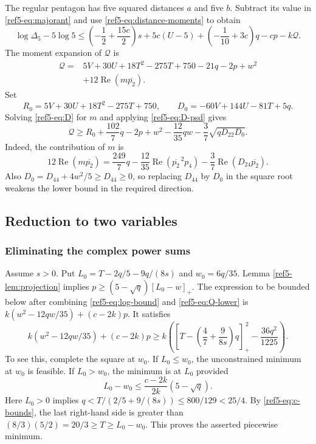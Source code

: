 \documentclass[11pt]{article}
\theoremstyle{remark}
\newcommand{\pos}[1]{[#1]_+}
\newcommand{\Rea}{\operatorname{Re}}
\numberwithin{equation}{section}
\begin{document}
The regular pentagon has five squared distances $a$ and five $b$.
Subtract its value in \eqref{ref5-eq:majorant} and use
\eqref{ref5-eq:distance-moments} to obtain
\begin{equation}\label{ref5-eq:log-bound}
 \log\Delta_5-5\log5\le
 \left(-\frac12+\frac{15c}{2}\right)s+5c(U-5)
 +\left(-\frac1{10}+3c\right)q-cp-k\mathcal Q.
\end{equation}
The moment expansion of $\mathcal Q$ is
\begin{equation}\label{ref5-eq:Q-expand}
\begin{aligned}
 \mathcal Q={}&5V+30U+18T^2-275T+750-21q-2p+w^2\\
             &+12\Rea(m\overline{p_2}).
\end{aligned}
\end{equation}
Set
\[
 R_0=5V+30U+18T^2-275T+750,\qquad
 D_0=-60V+144U-81T+5q.
\]
Solving \eqref{ref5-eq:D} for $m$ and applying \eqref{ref5-eq:D-psd} gives
\begin{equation}\label{ref5-eq:Q-lower}
 \mathcal Q\ge R_0+\frac{102}{7}q-2p+w^2-\frac{12}{35}qw
       -\frac37\sqrt{qD_{22}D_0}.
\end{equation}
Indeed, the contribution of $m$ is
\[
12\Rea(m\overline{p_2})
 =\frac{249}{7}q-\frac{12}{35}\Rea(\overline{p_2}^{\,2}p_4)
 -\frac37\Rea(D_{24}\overline{p_2}).
\]
Also $D_0=D_{44}+4w^2/5\ge D_{44}\ge0$, so replacing $D_{44}$
by $D_0$ in the square root weakens the lower bound in the required
direction.

\subsection{Reduction to two variables}
\subsubsection{Eliminating the complex power sums}
Assume $s>0$. Put $L_0=T-2q/5-9q/(8s)$ and $w_0=6q/35$.
Lemma \ref{ref5-lem:projection} implies
$p\ge(5-\sqrt q)\pos{L_0-w}$.
The expression to be bounded below after combining
\eqref{ref5-eq:log-bound} and \eqref{ref5-eq:Q-lower} is
$k(w^2-12qw/35)+(c-2k)p$.
It satisfies
\begin{equation}\label{ref5-eq:eliminate-pw}
 k(w^2-12qw/35)+(c-2k)p
 \ge k\left(\pos{T-\left(\frac47+\frac9{8s}\right)q}^{\,2}
                  -\frac{36q^2}{1225}\right).
\end{equation}
To see this, complete the square at $w_0$.
If $L_0\le w_0$, the unconstrained minimum at $w_0$ is feasible.
If $L_0>w_0$, the minimum is at $L_0$ provided
\[
 L_0-w_0\le\frac{c-2k}{2k}(5-\sqrt q).
\]
Here $L_0>0$ implies
$q<T/(2/5+9/(8s))\le800/129<25/4$.
By \eqref{ref5-eq:c-bounds}, the last right-hand side is greater than
$(8/3)(5/2)=20/3\ge T\ge L_0-w_0$.
This proves the asserted piecewise minimum.
\end{document}
